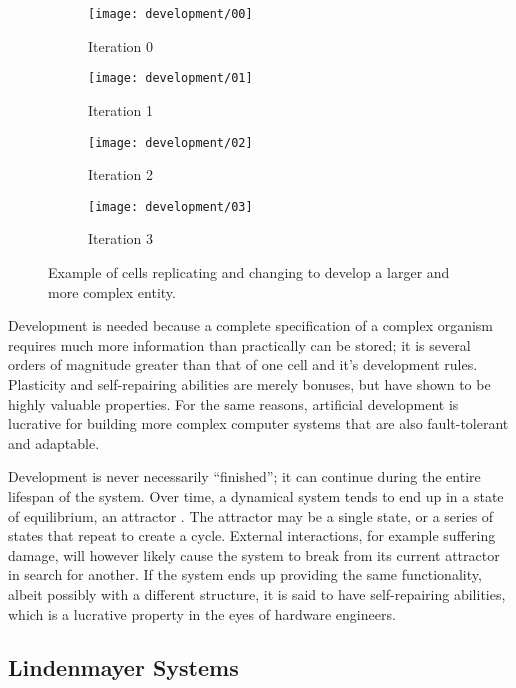 \begin{figure}[!ht]
    \centering
    \begin{subfigure}{0.24\textwidth}
        \centering
        \texttt{[image: development/00]}
        \caption{Iteration 0}
    \end{subfigure}
    \begin{subfigure}{0.24\textwidth}
        \centering
        \texttt{[image: development/01]}
        \caption{Iteration 1}
    \end{subfigure}
    \begin{subfigure}{0.24\textwidth}
        \centering
        \texttt{[image: development/02]}
        \caption{Iteration 2}
    \end{subfigure}
    \begin{subfigure}{0.24\textwidth}
        \centering
        \texttt{[image: development/03]}
        \caption{Iteration 3}
    \end{subfigure}
    \caption[Development]{
        Example of cells replicating and changing to develop a larger and more complex entity.
    }
    \label{fig:development}
\end{figure}

Development is needed because a complete specification of a complex organism requires much more information than practically can be stored; it is several orders of magnitude greater than that of one cell and it's development rules.
Plasticity and self-repairing abilities are merely bonuses, but have shown to be highly valuable properties.
For the same reasons, artificial development is lucrative for building more complex computer systems that are also fault-tolerant and adaptable.

Development is never necessarily ``finished''; it can continue during the entire lifespan of the system.
Over time, a dynamical system tends to end up in a state of equilibrium, an attractor \cite{heylighen2001selforg}.
The attractor may be a single state, or a series of states that repeat to create a cycle.
External interactions, for example suffering damage, will however likely cause the system to break from its current attractor in search for another.
If the system ends up providing the same functionality, albeit possibly with a different structure, it is said to have self-repairing abilities, which is a lucrative property in the eyes of hardware engineers.

\subsection{Lindenmayer Systems}

